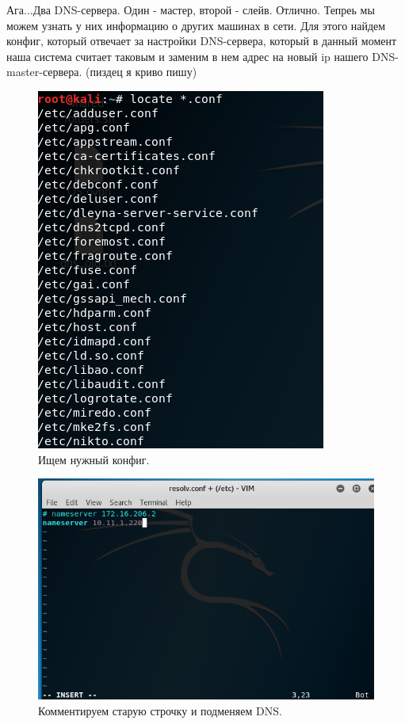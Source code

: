 \documentclass[a4paper,12pt]{article}
\begin{document}
Ага...Два DNS-сервера. Один - мастер, второй - слейв. Отлично. Тепреь мы можем узнать у них информацию о других машинах в сети.
Для этого найдем конфиг, который отвечает за настройки DNS-сервера, который в данный момент наша система считает таковым и заменим в нем адрес на новый ip нашего DNS-master-сервера. (пиздец я криво пишу)
\newpage
\begin{figure}[h!]
	\includegraphics[width=\linewidth]{searching_for_conf_5.png}
	\caption{Ищем нужный конфиг.}
	\label{fig:boat4}
\end{figure}

\begin{figure}[h!]
	\includegraphics[width=\linewidth]{resolv_conf_dns_7.png}
	\caption{Комментируем старую строчку и подменяем DNS.}
	\label{fig:boat2}
\end{figure}
\end{document}
